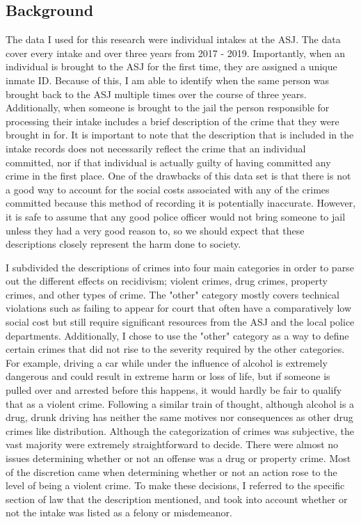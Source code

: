 \documentclass{article}
\begin{document}
\subsection{Background}
The data I used for this research were individual intakes at the ASJ. The data cover every intake and over three years from  2017 - 2019. Importantly, when an individual is brought to the ASJ for the first time, they are assigned a unique inmate ID. Because of this, I am able to identify when the same person was brought back to the ASJ multiple times over the course of three years. Additionally, when someone is brought to the jail the person responsible for processing their intake includes a brief description of the crime that they were brought in for. It is important to note that the description that is included in the intake records does not necessarily reflect the crime that an individual committed, nor if that individual is actually guilty of having committed any crime in the first place. One of the drawbacks of this data set is that there is not a good way to account for the social costs associated with any of the crimes committed because this method of recording it is potentially inaccurate. However, it is safe to assume that any good police officer would not bring someone to jail unless they had a very good reason to, so we should expect that these descriptions closely represent the harm done to society. 

I subdivided the descriptions of crimes into four main categories in order to parse out the different effects on recidivism; violent crimes, drug crimes, property crimes, and other types of crime. The "other" category mostly covers technical violations such as failing to appear for court that often have a comparatively low social cost but still require significant resources from the ASJ and the local police departments. Additionally, I chose to use the "other" category as a way to define certain crimes that did not rise to the severity required by the other categories. For example, driving a car while under the influence of alcohol is extremely dangerous and could result in extreme harm or loss of life, but if someone is pulled over and arrested before this happens, it would hardly be fair to qualify that as a violent crime. Following a similar train of thought, although alcohol is a drug, drunk driving has neither the same motives nor consequences as other drug crimes like distribution. Although the categorization of crimes was subjective, the vast majority were extremely straightforward to decide. There were almost no issues determining whether or not an offense was a drug or property crime. Most of the discretion came when determining whether or not an action rose to the level of being a violent crime. To make these decisions, I referred to the specific section of law that the description mentioned, and took into account whether or not the intake was listed as a felony or misdemeanor. 
\end{document}
